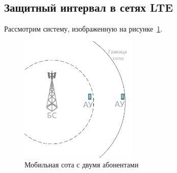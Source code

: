 \subsection{Защитный интервал в сетях LTE}
Рассмотрим систему, изображенную на рисунке~\ref{fig:vol_mobile_cell}.
\begin{figure}[H]
    \centering
    \includegraphics[width=0.5\textwidth]{img/vol_mobile_cell}
    \caption{Мобильная сота с двумя абонентами}
    \label{fig:vol_mobile_cell}
\end{figure}

